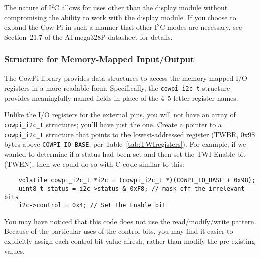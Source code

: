 The nature of I$^2$C allows for uses other than the display module without compromising the ability to work with the display module.
If you choose to expand the Cow Pi in such a manner that other I$^2$C modes are necessary, see Section~21.7 of the ATmega328P datasheet\cite{ATmega328P} for details.

\subsubsection{Structure for Memory-Mapped Input/Output} \label{subsubsec:TWIstruct}

The CowPi library provides data structures to access the memory-mapped I/O registers in a more readable form.
Specifically, the \lstinline{cowpi_i2c_t} structure provides meaningfully-named fields in place of the 4--5-letter register names.

\newpage


Unlike the I/O registers for the external pins, you will not have an array of \lstinline{cowpi_i2c_t} structures;
you'll have just the one.
Create a pointer to a \lstinline{cowpi_i2c_t} structure that points to the lowest-addressed register (TWBR, 0x98 bytes above \lstinline{COWPI_IO_BASE}, per Table~\ref{tab:TWIregisters}).
For example, if we wanted to determine if a status had been set and then set the TWI Enable bit (TWEN), then we could do so with C code similar to this:

\begin{lstlisting}
    volatile cowpi_i2c_t *i2c = (cowpi_i2c_t *)(COWPI_IO_BASE + 0x98);
    uint8_t status = i2c->status & 0xF8; // mask-off the irrelevant bits
    i2c->control = 0x4; // Set the Enable bit
\end{lstlisting}


You may have noticed that this code does not use the read/modify/write pattern.
Because of the particular uses of the control bits, you may find it easier to explicitly assign each control bit value afresh, rather than modify the pre-existing values.

